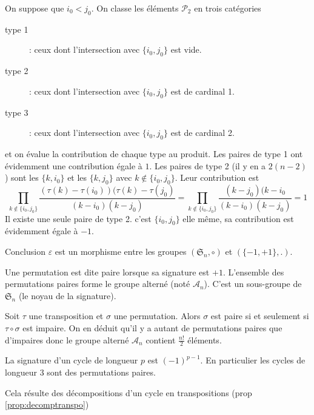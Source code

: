 \begin{demo}
 On suppose que $i_0<j_0$. On classe les éléments  $\mathcal P_2$ en trois catégories
\begin{description}
 \item [type 1] : ceux dont l'intersection avec $\{i_0,j_0\}$ est vide.
\item [type 2] : ceux dont l'intersection avec $\{i_0,j_0\}$ est de cardinal 1.
\item [type 3] : ceux dont l'intersection avec $\{i_0,j_0\}$ est de cardinal 2.
\end{description}
et on évalue la contribution de chaque type au produit.\newline
Les paires de type 1 ont évidemment une contribution égale à $1$.\newline
Les paires de type 2 (il y en a $2(n-2)$) sont les $\{k,i_0\}$ et les $\{k,j_0\}$ avec $k\not\in\{i_0,j_0\}$. Leur contribution est
\begin{displaymath}
 \prod_{k\not\in\{i_0,j_0\}}\dfrac{(\tau(k)-\tau(i_0))(\tau(k)-\tau(j_0)}{(k-i_0)(k-j_0)}
=
 \prod_{k\not\in\{i_0,j_0\}}\dfrac{(k-j_0)(k-i_0}{(k-i_0)(k-j_0)} =1
\end{displaymath}
Il existe une seule paire de type 2. c'est $\{i_0,j_0\}$ elle même, sa contribution est évidemment égale à $-1$.
\end{demo}
Conclusion $\varepsilon$ est un morphisme entre les groupes $(\mathfrak S_n,\circ)$ et $(\{-1,+1\},.)$.
\begin{defi}
 Une permutation est dite paire lorsque sa signature est $+1$. L'ensemble des permutations paires forme le groupe alterné (noté $\mathcal A_n$). C'est un sous-groupe de $\mathfrak S_n$ (le noyau de la signature).
\end{defi}
\begin{rem}
 Soit $\tau$ une transposition et $\sigma$ une permutation. Alors $\sigma$ est paire si et seulement si $\tau \circ \sigma$ est impaire. On en déduit qu'il y a autant de permutations paires que d'impaires donc le groupe alterné $\mathcal A_n$ contient $\frac{n!}{2}$ éléments.
\end{rem}

\begin{propn}
 La signature d'un cycle de longueur $p$ est $(-1)^{p-1}$. En particulier les cycles de longueur $3$ sont des permutations paires.
\end{propn}
\begin{demo}
 Cela résulte des décompositions d'un cycle en transpositions (prop \ref{prop:decomptranspo})
\end{demo}


